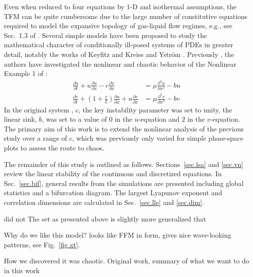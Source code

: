 \documentclass{ws-ijbc}
\newcommand\beqa{\begin{equation}\begin{aligned}}
\newcommand\eeqa{\end{aligned}\end{equation}}
\begin{document}
Even when reduced to four equations by 1-D and isothermal assumptions, the TFM can be quite cumbersome due to the large number of constitutive equations required to model the expansive topology of gas-liquid flow regimes, e.g., see Sec.~1.3 of \cite{ishiihibiki}. Several simple models have been proposed to study the mathematical character of conditionally ill-posed systems of PDEs in greater detail, notably the works of Keyfitz \cite{keyfitz03,keyfitz04} and Kreiss and Ystr\"{o}m \cite{kreiss02}. Previously \citep{fullmer14}, the authors have investigated the nonlinear and chaotic behavior of the Nonlinear Example 1 of \citet{kreiss02}: 
\beqa
\frac{\partial u}{\partial t} + u \frac{\partial u}{\partial x} - c \frac{\partial v}{\partial x} &= \mu \frac{{\partial}^2 u}{\partial x^2} - b u  \\
\frac{\partial v}{\partial t} + \left(1 + \frac{v}{2}\right) \frac{\partial u}{\partial x} + u \frac{\partial v}{\partial x} &= \mu \frac{\partial^2 v}{\partial x^2} - b v 
\label{eq.ky}
\eeqa
In the original system \citep{kreiss02}, $c$, the key instability parameter was set to unity, the linear sink, $b$, was set to a value of $0$ in the $u$-equation and $2$ in the $v$-equation. The primary aim of this work is to extend the nonlinear analysis of the previous study over a range of $c$, which was previously only varied for simple phase-space plots to assess the route to chaos. 

The remainder of this study is outlined as follows. Sections~\ref{sec.lsa} and \ref{sec.vn} review the linear stability of the continuous and discretized equations. In Sec.~\ref{sec.bif}, general results from the simulations are presented including global statistics and a bifurcation diagram. The largest Lyapunov exponent and correlation dimensions are calculated in Sec.~\ref{sec.lle} and \ref{sec.dim}. 




did not  The set as presented above is slightly more generalized that 




Why do we like this model? looks like FFM in form, gives nice wave-looking patterns, see Fig.~\ref{fig.xt}. 


How we discovered it was chaotic. 
Original work, summary of what we want to do in this work 


\end{document}
